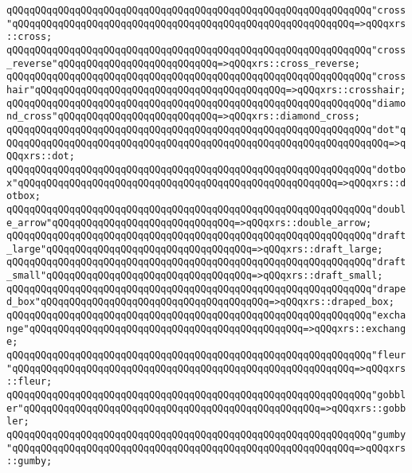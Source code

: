 \verb|qQQqqQQqqQQqqQQqqQQqqQQqqQQqqQQqqQQqqQQqqQQqqQQqqQQqqQQqqQQqqQQq"cross"qQQqqQQqqQQqqQQqqQQqqQQqqQQqqQQqqQQqqQQqqQQqqQQqqQQqqQQqqQQq=>qQQqxrs::cross;|\newline
\verb|qQQqqQQqqQQqqQQqqQQqqQQqqQQqqQQqqQQqqQQqqQQqqQQqqQQqqQQqqQQqqQQq"cross_reverse"qQQqqQQqqQQqqQQqqQQqqQQqqQQq=>qQQqxrs::cross_reverse;|\newline
\verb|qQQqqQQqqQQqqQQqqQQqqQQqqQQqqQQqqQQqqQQqqQQqqQQqqQQqqQQqqQQqqQQq"crosshair"qQQqqQQqqQQqqQQqqQQqqQQqqQQqqQQqqQQqqQQqqQQq=>qQQqxrs::crosshair;|\newline
\verb|qQQqqQQqqQQqqQQqqQQqqQQqqQQqqQQqqQQqqQQqqQQqqQQqqQQqqQQqqQQqqQQq"diamond_cross"qQQqqQQqqQQqqQQqqQQqqQQqqQQq=>qQQqxrs::diamond_cross;|\newline
\verb|qQQqqQQqqQQqqQQqqQQqqQQqqQQqqQQqqQQqqQQqqQQqqQQqqQQqqQQqqQQqqQQq"dot"qQQqqQQqqQQqqQQqqQQqqQQqqQQqqQQqqQQqqQQqqQQqqQQqqQQqqQQqqQQqqQQqqQQq=>qQQqxrs::dot;|\newline
\verb|qQQqqQQqqQQqqQQqqQQqqQQqqQQqqQQqqQQqqQQqqQQqqQQqqQQqqQQqqQQqqQQq"dotbox"qQQqqQQqqQQqqQQqqQQqqQQqqQQqqQQqqQQqqQQqqQQqqQQqqQQqqQQq=>qQQqxrs::dotbox;|\newline
\verb|qQQqqQQqqQQqqQQqqQQqqQQqqQQqqQQqqQQqqQQqqQQqqQQqqQQqqQQqqQQqqQQq"double_arrow"qQQqqQQqqQQqqQQqqQQqqQQqqQQqqQQq=>qQQqxrs::double_arrow;|\newline
\verb|qQQqqQQqqQQqqQQqqQQqqQQqqQQqqQQqqQQqqQQqqQQqqQQqqQQqqQQqqQQqqQQq"draft_large"qQQqqQQqqQQqqQQqqQQqqQQqqQQqqQQqqQQq=>qQQqxrs::draft_large;|\newline
\verb|qQQqqQQqqQQqqQQqqQQqqQQqqQQqqQQqqQQqqQQqqQQqqQQqqQQqqQQqqQQqqQQq"draft_small"qQQqqQQqqQQqqQQqqQQqqQQqqQQqqQQqqQQq=>qQQqxrs::draft_small;|\newline
\verb|qQQqqQQqqQQqqQQqqQQqqQQqqQQqqQQqqQQqqQQqqQQqqQQqqQQqqQQqqQQqqQQq"draped_box"qQQqqQQqqQQqqQQqqQQqqQQqqQQqqQQqqQQqqQQq=>qQQqxrs::draped_box;|\newline
\verb|qQQqqQQqqQQqqQQqqQQqqQQqqQQqqQQqqQQqqQQqqQQqqQQqqQQqqQQqqQQqqQQq"exchange"qQQqqQQqqQQqqQQqqQQqqQQqqQQqqQQqqQQqqQQqqQQqqQQq=>qQQqxrs::exchange;|\newline
\verb|qQQqqQQqqQQqqQQqqQQqqQQqqQQqqQQqqQQqqQQqqQQqqQQqqQQqqQQqqQQqqQQq"fleur"qQQqqQQqqQQqqQQqqQQqqQQqqQQqqQQqqQQqqQQqqQQqqQQqqQQqqQQqqQQq=>qQQqxrs::fleur;|\newline
\verb|qQQqqQQqqQQqqQQqqQQqqQQqqQQqqQQqqQQqqQQqqQQqqQQqqQQqqQQqqQQqqQQq"gobbler"qQQqqQQqqQQqqQQqqQQqqQQqqQQqqQQqqQQqqQQqqQQqqQQqqQQq=>qQQqxrs::gobbler;|\newline
\verb|qQQqqQQqqQQqqQQqqQQqqQQqqQQqqQQqqQQqqQQqqQQqqQQqqQQqqQQqqQQqqQQq"gumby"qQQqqQQqqQQqqQQqqQQqqQQqqQQqqQQqqQQqqQQqqQQqqQQqqQQqqQQqqQQq=>qQQqxrs::gumby;|\newline
